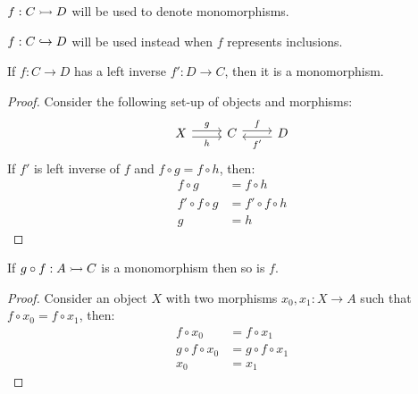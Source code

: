 \begin{remark}
  $f:C\rightarrowtail D$ will be used to denote monomorphisms.
\end{remark}

\begin{remark}
  $f:C\hookrightarrow D$ will be used instead when $f$ represents inclusions.
\end{remark}

\begin{theorem}\label{thm:left_inverse_implies_mono}

  If $f:C\to D$ has a left inverse $f':D\to C$, then it is a monomorphism.

  \begin{proof}
    Consider the following set-up of objects and morphisms:
    \[\begin{tikzcd}[ampersand replacement=\&]
      X \& C \& D
      \arrow["f", shift left=1, from=1-2, to=1-3]
      \arrow["g", shift left=1, from=1-1, to=1-2]
      \arrow["h"', shift right=1, from=1-1, to=1-2]
      \arrow["{f'}", shift left=1, from=1-3, to=1-2]
    \end{tikzcd}\]
    If $f'$ is left inverse of $f$ and $f\circ g = f\circ h$, then:
    \[
      \begin{aligned}
        f\circ g &= f\circ h\\
        f'\circ f \circ g &= f'\circ f\circ h\\
        g &= h
      \end{aligned}
    \]
  \end{proof}
  \vspace{-\baselineskip}
\end{theorem}

\begin{theorem}
  If $g\circ f: A\rightarrowtail C$ is a monomorphism then so is $f$.

  \begin{proof}
    Consider an object $X$ with two morphisms $x_0, x_1:X\to A$ such that
    $f\circ x_0 = f\circ x_1$, then:
    \[
      \begin{aligned}
        f\circ x_0 &= f\circ x_1\\
        g\circ f \circ x_0 &= g \circ f \circ x_1\\
        x_0 &= x_1
      \end{aligned}
    \]
  \end{proof}
  \vspace{-\baselineskip}
\end{theorem}

